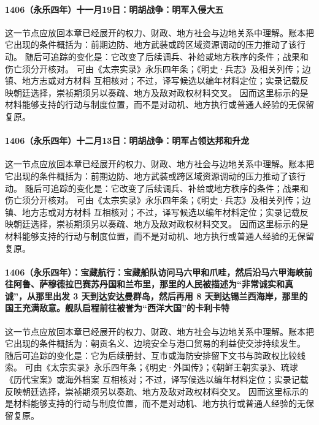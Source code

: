 \paragraph{1406（永乐四年）十一月19日：明胡战争：明军入侵大五} 这一节点应放回本章已经展开的权力、财政、地方社会与边地关系中理解。账本把它出现的条件概括为：前期边防、地方武装或跨区域资源调动的压力推动了该行动。 随后可追踪的变化是：它改变了后续调兵、补给或地方秩序的条件；战果和伤亡须分开核对。 可由《太宗实录》永乐四年条；《明史·兵志》及相关列传；边镇、地方志或对方材料 互相核对；不过，译写候选以编年材料定位；实录记载反映朝廷选择，崇祯期须另以奏疏、地方及敌对政权材料交叉。 因而这里标示的是材料能够支持的行动与制度位置，而不是对动机、地方执行或普通人经验的无保留复原。

\paragraph{1406（永乐四年）十二月13日：明胡战争：明军占领达邦和升龙} 这一节点应放回本章已经展开的权力、财政、地方社会与边地关系中理解。账本把它出现的条件概括为：前期边防、地方武装或跨区域资源调动的压力推动了该行动。 随后可追踪的变化是：它改变了后续调兵、补给或地方秩序的条件；战果和伤亡须分开核对。 可由《太宗实录》永乐四年条；《明史·兵志》及相关列传；边镇、地方志或对方材料 互相核对；不过，译写候选以编年材料定位；实录记载反映朝廷选择，崇祯期须另以奏疏、地方及敌对政权材料交叉。 因而这里标示的是材料能够支持的行动与制度位置，而不是对动机、地方执行或普通人经验的无保留复原。

\paragraph{1406（永乐四年）：宝藏航行：宝藏船队访问马六甲和爪哇，然后沿马六甲海峡前往阿鲁、萨穆德拉巴赛苏丹国和兰布里，那里的人民被描述为“非常诚实和真诚”，从那里出发 3 天到达安达曼群岛，然后再用 8 天到达锡兰西海岸，那里的国王充满敌意。舰队启程前往被誉为“西洋大国”的卡利卡特} 这一节点应放回本章已经展开的权力、财政、地方社会与边地关系中理解。账本把它出现的条件概括为：朝贡名义、边境安全与港口贸易的利益使交涉持续发生。 随后可追踪的变化是：它为后续册封、互市或海防安排留下文书与跨政权比较线索。 可由《太宗实录》永乐四年条；《明史·外国传》；《朝鲜王朝实录》、琉球《历代宝案》或海外档案 互相核对；不过，译写候选以编年材料定位；实录记载反映朝廷选择，崇祯期须另以奏疏、地方及敌对政权材料交叉。 因而这里标示的是材料能够支持的行动与制度位置，而不是对动机、地方执行或普通人经验的无保留复原。

